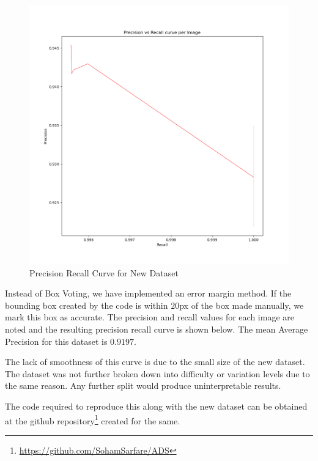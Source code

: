 \documentclass{article}
\begin{document}
\begin{figure}
	\includegraphics[width=\linewidth]{all.png}
	\caption{Precision Recall Curve for New Dataset}
\end{figure}

Instead of Box Voting, we have implemented an error margin method. If the bounding box created by the code is within $20$px of the box made manually, we mark this box as accurate. The precision and recall values for each image are noted and the resulting precision recall curve is shown below. The mean Average Precision for this dataset is $0.9197$.

The lack of smoothness of this curve is due to the small size of the new dataset. The dataset was not further broken down into difficulty or variation levels due to the same reason. Any further split would produce uninterpretable results. 

The code required to reproduce this along with the new dataset can be obtained at the github repository\footnote{\url{https://github.com/SohamSarfare/ADS}} created for the same.
\end{document}
